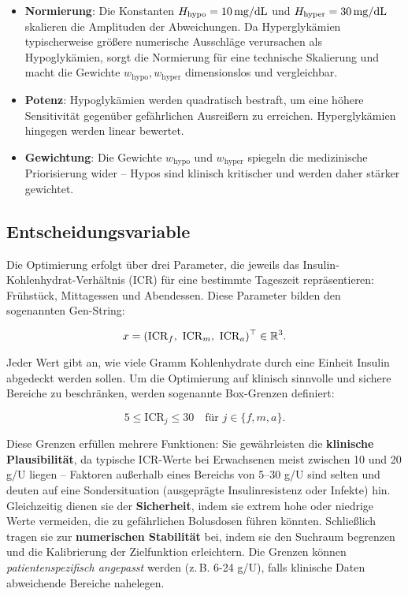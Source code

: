 \begin{itemize}
    \item \textbf{Normierung}: Die Konstanten \(H_{\text{hypo}} = 10\,\mathrm{mg/dL}\) und \(H_{\text{hyper}} = 30\,\mathrm{mg/dL}\) skalieren die Amplituden der Abweichungen. Da Hyperglykämien typischerweise größere numerische Ausschläge verursachen als Hypoglykämien, sorgt die Normierung für eine technische Skalierung und macht die Gewichte \(w_{\mathrm{hypo}}, w_{\mathrm{hyper}}\) dimensionslos und vergleichbar.
    \item \textbf{Potenz}: Hypoglykämien werden quadratisch bestraft, um eine höhere Sensitivität gegenüber gefährlichen Ausreißern zu erreichen. Hyperglykämien hingegen werden linear bewertet.
    \item \textbf{Gewichtung}: Die Gewichte \(w_{\mathrm{hypo}}\) und \(w_{\mathrm{hyper}}\) spiegeln die medizinische Priorisierung wider – Hypos sind klinisch kritischer und werden daher stärker gewichtet.
\end{itemize}

\subsection{Entscheidungsvariable}

Die Optimierung erfolgt über drei Parameter, die jeweils das Insulin-Kohlenhydrat-Verhältnis (ICR) für eine bestimmte Tageszeit repräsentieren: Frühstück, Mittagessen und Abendessen. Diese Parameter bilden den sogenannten Gen-String:

\[
x = (\mathrm{ICR}_f,\ \mathrm{ICR}_m,\ \mathrm{ICR}_a)^\top \in \mathbb{R}^3.
\]

\noindent Jeder Wert gibt an, wie viele Gramm Kohlenhydrate durch eine Einheit Insulin abgedeckt werden sollen. Um die Optimierung auf klinisch sinnvolle und sichere Bereiche zu beschränken, werden sogenannte Box-Grenzen definiert:

\[
5 \le \mathrm{ICR}_j \le 30 \quad \text{für } j \in \{f,m,a\}.
\]

\noindent Diese Grenzen erfüllen mehrere Funktionen: Sie gewährleisten die \textbf{klinische Plausibilität}, da typische ICR-Werte bei Erwachsenen meist zwischen 10 und 20 g/U liegen – Faktoren außerhalb eines Bereichs von 5–30 g/U sind selten und deuten auf eine Sondersituation (ausgeprägte Insulinresistenz oder Infekte) hin. Gleichzeitig dienen sie der \textbf{Sicherheit}, indem sie extrem hohe oder niedrige Werte vermeiden, die zu gefährlichen Bolusdosen führen könnten. Schließlich tragen sie zur \textbf{numerischen Stabilität} bei, indem sie den Suchraum begrenzen und die Kalibrierung der Zielfunktion erleichtern.
\noindent Die Grenzen können \emph{patientenspezifisch angepasst} werden (z.\,B. 6-24 g/U), falls klinische Daten abweichende Bereiche nahelegen.

